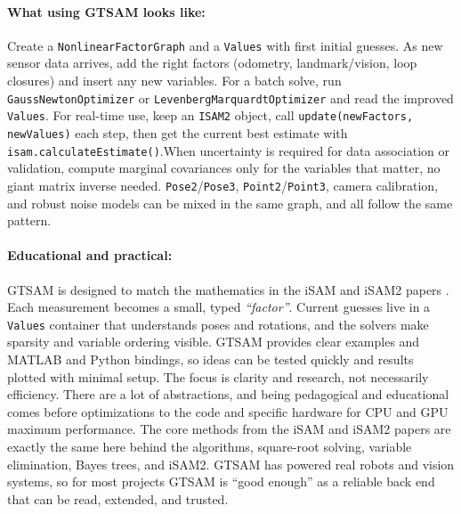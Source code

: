 \paragraph{What using GTSAM looks like:}
Create a \texttt{NonlinearFactorGraph} and a \texttt{Values} with first initial guesses. As new sensor data arrives, add the right factors (odometry, landmark/vision, loop closures) and insert any new variables. For a batch solve, run \texttt{GaussNewtonOptimizer} or \texttt{LevenbergMarquardtOptimizer} and read the improved \texttt{Values}. For real-time use, keep an \texttt{ISAM2} object, call \texttt{update(newFactors, newValues)} each step, then get the current best estimate with \texttt{isam.calculateEstimate()}.When uncertainty is required for data association or validation, compute marginal covariances only for the variables that matter, no giant matrix inverse needed. \texttt{Pose2}/\texttt{Pose3}, \texttt{Point2}/\texttt{Point3}, camera calibration, and robust noise models can be mixed in the same graph, and all follow the same pattern. \cite{GTSAM_handbook}

\paragraph{Educational and practical:}
GTSAM is designed to match the mathematics in the iSAM and iSAM2 papers \cite{iSAM_paper,iSAM2_paper}. Each measurement becomes a small, typed \textit{``factor''}. Current guesses live in a \texttt{Values} container that understands poses and rotations, and the solvers make sparsity and variable ordering visible. GTSAM provides clear examples and MATLAB and Python bindings, so ideas can be tested quickly and results plotted with minimal setup. The focus is clarity and research, not necessarily efficiency. There are a lot of abstractions, and being pedagogical and educational comes before optimizations to the code and specific hardware for CPU and GPU maximum performance. The core methods from the iSAM and iSAM2 papers \cite{iSAM_paper,iSAM2_paper} are exactly the same here behind the algorithms, square-root solving, variable elimination, Bayes trees, and iSAM2. GTSAM has powered real robots and vision systems, so for most projects GTSAM is ``good enough'' as a reliable back end that can be read, extended, and trusted. \cite{GTSAM_handbook}

